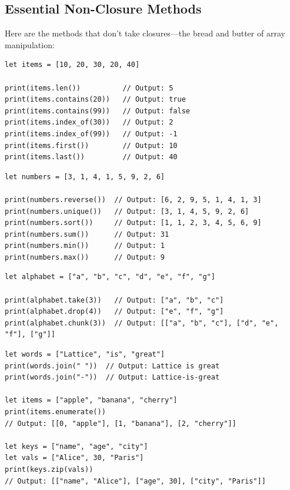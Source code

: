 \subsection{Essential Non-Closure Methods}\label{sec:array-basic-methods}

Here are the methods that don't take closures---the bread and butter of array manipulation:

\begin{lstlisting}[language=Lattice, caption={Array inspection methods}]
let items = [10, 20, 30, 20, 40]

print(items.len())          // Output: 5
print(items.contains(20))   // Output: true
print(items.contains(99))   // Output: false
print(items.index_of(30))   // Output: 2
print(items.index_of(99))   // Output: -1
print(items.first())        // Output: 10
print(items.last())         // Output: 40
\end{lstlisting}

\begin{lstlisting}[language=Lattice, caption={Array transformation methods}]
let numbers = [3, 1, 4, 1, 5, 9, 2, 6]

print(numbers.reverse())  // Output: [6, 2, 9, 5, 1, 4, 1, 3]
print(numbers.unique())   // Output: [3, 1, 4, 5, 9, 2, 6]
print(numbers.sort())     // Output: [1, 1, 2, 3, 4, 5, 6, 9]
print(numbers.sum())      // Output: 31
print(numbers.min())      // Output: 1
print(numbers.max())      // Output: 9
\end{lstlisting}

\begin{lstlisting}[language=Lattice, caption={Array subsetting methods}]
let alphabet = ["a", "b", "c", "d", "e", "f", "g"]

print(alphabet.take(3))   // Output: ["a", "b", "c"]
print(alphabet.drop(4))   // Output: ["e", "f", "g"]
print(alphabet.chunk(3))  // Output: [["a", "b", "c"], ["d", "e", "f"], ["g"]]
\end{lstlisting}

\begin{lstlisting}[language=Lattice, caption={join, enumerate, and zip}]
let words = ["Lattice", "is", "great"]
print(words.join(" "))  // Output: Lattice is great
print(words.join("-"))  // Output: Lattice-is-great

let items = ["apple", "banana", "cherry"]
print(items.enumerate())
// Output: [[0, "apple"], [1, "banana"], [2, "cherry"]]

let keys = ["name", "age", "city"]
let vals = ["Alice", 30, "Paris"]
print(keys.zip(vals))
// Output: [["name", "Alice"], ["age", 30], ["city", "Paris"]]
\end{lstlisting}

